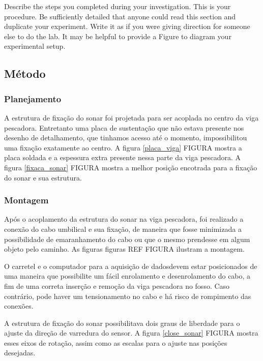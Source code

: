 
Describe the steps you completed during your investigation. This is your procedure. Be sufficiently detailed that anyone could read this section and duplicate your experiment. Write it as if you were giving direction for someone else to do the lab. It may be helpful to provide a Figure to diagram your experimental setup.


\subsection{Método}

\subsubsection{Planejamento}
A estrutura de fixação do sonar foi projetada para ser acoplada no centro
da viga pescadora. Entretanto uma placa de sustentação que não estava presente
nos desenho de detalhamento, que tinhamos acesso até o momento,
impossibilitou uma fixação exatamente ao centro. A figura \ref{placa_viga} FIGURA mostra a
placa soldada e a espessura extra presente nessa parte da viga pescadora. A figura
\ref{fixaca_sonar} FIGURA mostra a melhor posição encotrada para a fixação do
sonar e sua estrutura.

\subsubsection{Montagem}
Após o acoplamento da estrutura do sonar na viga pescadora, foi realizado a
conexão do cabo umbilical e sua fixação, de maneira que fosse
minimizada a possibilidade de emaranhamento do cabo ou que o mesmo prendesse em
algum objeto pelo caminho. As figuras figuras REF FIGURA ilustram a montagem.

O carretel e o computador para a aquisição de dadosdevem estar
posicionados de uma maneira que possibilite um fácil enrolamento e desenrolamento do cabo, a fim de
uma correta inserção e remoção da viga pescadora no fosso. Caso contrário, pode
haver um tensionamento no cabo e há risco de rompimento das conexões.

A estrutura de fixação do sonar possibilitava dois graus de liberdade para o
ajuste da direção de varredura do sensor. A figura \ref{close_sonar} FIGURA
mostra esses eixos de rotação, assim como as escalas para o ajuste nas
posições desejadas.

